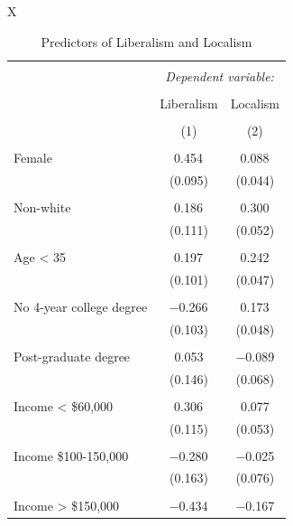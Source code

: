 \documentclass[article,12pt]{memoir}
\begin{document}


\begin{table}
  \caption{Predictors of Liberalism and Localism}
  \label{tab:hg_e_lib_loc_regression}
  \begin{threeparttable}
  \footnotesize
  \begin{tabularx}{\linewidth}{X}
  \centering

\begin{tabular}{@{\extracolsep{5pt}}lcc} 
\\[-1.8ex]\hline 
\hline \\[-1.8ex] 
 & \multicolumn{2}{c}{\textit{Dependent variable:}} \\ 
\cline{2-3} 
\\[-1.8ex] & Liberalism & Localism\\
\\[-1.8ex] & (1) & (2)\\ 
\hline \\[-1.8ex] 
 Female & 0.454$^{}$ & 0.088$^{}$ \\ 
  & (0.095) & (0.044) \\ 
  & & \\ 
 Non-white & 0.186$^{}$ & 0.300$^{}$ \\ 
  & (0.111) & (0.052) \\ 
  & & \\ 
 Age < 35 & 0.197$^{}$ & 0.242$^{}$ \\ 
  & (0.101) & (0.047) \\ 
  & & \\ 
 No 4-year college degree & $-$0.266$^{}$ & 0.173$^{}$ \\ 
  & (0.103) & (0.048) \\ 
  & & \\ 
 Post-graduate degree & 0.053 & $-$0.089 \\ 
  & (0.146) & (0.068) \\ 
  & & \\ 
 Income < \$60,000 & 0.306$^{}$ & 0.077 \\ 
  & (0.115) & (0.053) \\ 
  & & \\ 
 Income \$100-150,000 & $-$0.280$^{}$ & $-$0.025 \\ 
  & (0.163) & (0.076) \\ 
  & & \\ 
 Income > \$150,000 & $-$0.434$^{}$ & $-$0.167 \\ 

\end{tabular}
\end{tabularx}
\end{threeparttable}
\end{table}
\end{document}
